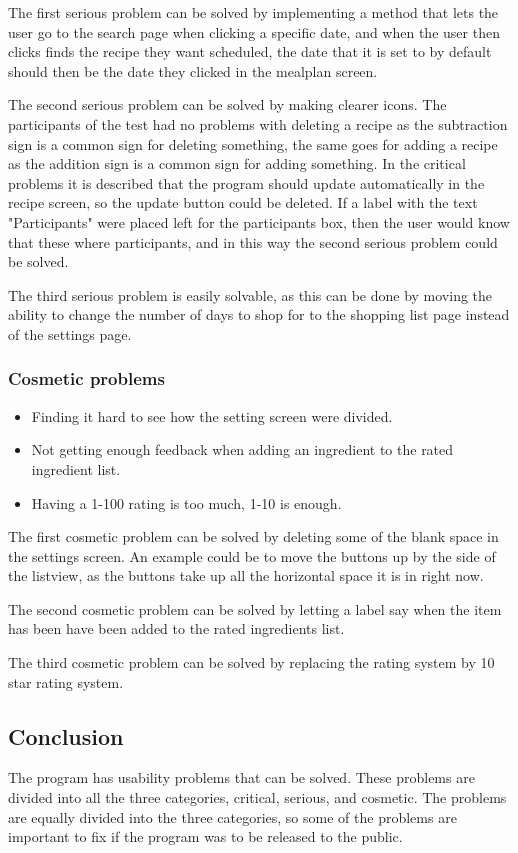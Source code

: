 The first serious problem can be solved by implementing a method that lets the user go to the search page when clicking a specific date, and when the user then clicks finds the recipe they want scheduled, the date that it is set to by default should then be the date they clicked in the mealplan screen.

The second serious problem can be solved by making clearer icons. The participants of the test had no problems with deleting a recipe as the subtraction sign is a common sign for deleting something, the same goes for adding a recipe as the addition sign is a common sign for adding something. In the critical problems it is described that the program should update automatically in the recipe screen, so the update button could be deleted. If a label with the text "Participants" were placed left for the participants box, then the user would know that these where participants, and in this way the second serious problem could be solved.

The third serious problem is easily solvable, as this can be done by moving the ability to change the number of days to shop for to the shopping list page instead of the settings page.

\subsubsection{Cosmetic problems}

\begin{itemize}
    \item Finding it hard to see how the setting screen were divided.
    \item Not getting enough feedback when adding an ingredient to the rated ingredient list.
    \item Having a 1-100 rating is too much, 1-10 is enough.
\end{itemize}

The first cosmetic problem can be solved by deleting some of the blank space in the settings screen. An example could be to move the buttons up by the side of the listview, as the buttons take up all the horizontal space it is in right now.

The second cosmetic problem can be solved by letting a label say when the item has been have been added to the rated ingredients list.

The third cosmetic problem can be solved by replacing the rating system by 10 star rating system.

\subsection{Conclusion}

The program has usability problems that can be solved. These problems are divided into all the three categories, critical, serious, and cosmetic. The problems are equally divided into the three categories, so some of the problems are important to fix if the program was to be released to the public.